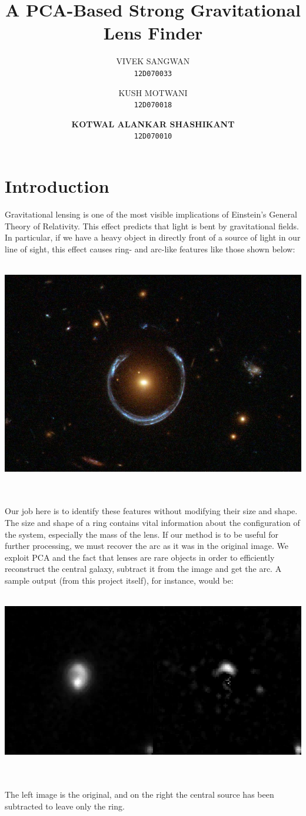 \documentclass[11pt, a4paper]{article}
\author{
  VIVEK SANGWAN\\
  \texttt{12D070033}
  \and
  KUSH MOTWANI\\
  \texttt{12D070018}
  \and
  \textbf{KOTWAL ALANKAR SHASHIKANT}\\
  \texttt{12D070010}
  \and
}
\title{A PCA-Based Strong Gravitational Lens Finder}
\begin{document}
\maketitle
\newpage

\section{Introduction}
Gravitational lensing is one of the most visible implications of Einstein’s General Theory of Relativity. This effect predicts that light is bent by gravitational fields. In particular, if we have a heavy object in directly front of a source of light in our line of sight, this effect causes ring- and arc-like features like those shown below:\\ \\
\centerline{\includegraphics[scale=0.35]{lens_intro.png}}
\\ \\
Our job here is to identify these features without modifying their size and shape. The size and shape of a ring contains vital information about the configuration of the system, especially the mass of the lens. If our method is to be useful for further processing, we must recover the arc as it was in the original image. We exploit PCA and the fact that lenses are rare objects in order to efficiently reconstruct the central galaxy, subtract it from the image and get the arc. A sample output (from this project itself), for instance, would be: \\ \\
\centerline{\includegraphics[scale=0.4]{montage.png}}
\\ \\
The left image is the original, and on the right the central source has been subtracted to leave only the ring.
\end{document}
